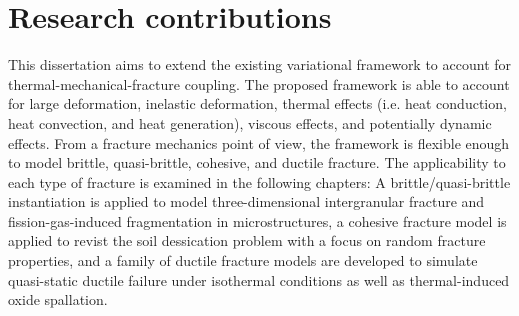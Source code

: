 \section{Research contributions}

This dissertation aims to extend the existing variational framework to account for thermal-mechanical-fracture coupling. The proposed framework is able to account for large deformation, inelastic deformation, thermal effects (i.e. heat conduction, heat convection, and heat generation), viscous effects, and potentially dynamic effects. From a fracture mechanics point of view, the framework is flexible enough to model brittle, quasi-brittle, cohesive, and ductile fracture. The applicability to each type of fracture is examined in the following chapters: A brittle/quasi-brittle instantiation is applied to model three-dimensional intergranular fracture and fission-gas-induced fragmentation in microstructures, a cohesive fracture model is applied to revist the soil dessication problem with a focus on random fracture properties, and a family of ductile fracture models are developed to simulate quasi-static ductile failure under isothermal conditions as well as thermal-induced oxide spallation.

